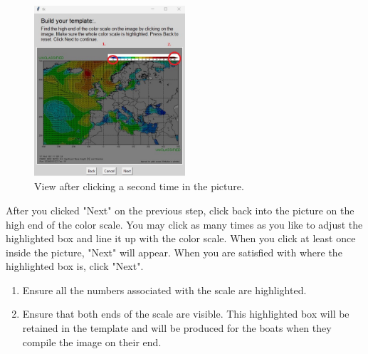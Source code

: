 \begin{figure}[H]
    \centering\includegraphics[width=0.5\textwidth]{TeX/Build_Template3.jpg}
    \caption{View after clicking a second time in the picture.}
\end{figure}
After you clicked "Next" on the previous step, click back into the picture on the high end of the color scale. You may click as many times as you like to adjust the highlighted box and line it up with the color scale. When you click at least once inside the picture, "Next" will appear. When you  are satisfied with where the highlighted box is, click "Next".
\begin{enumerate}
    \item Ensure all the numbers associated with the scale are highlighted.
    \item Ensure that both ends of the scale are visible. This highlighted box will be retained in the template and will be produced for the boats when they compile the image on their end.
\end{enumerate}

